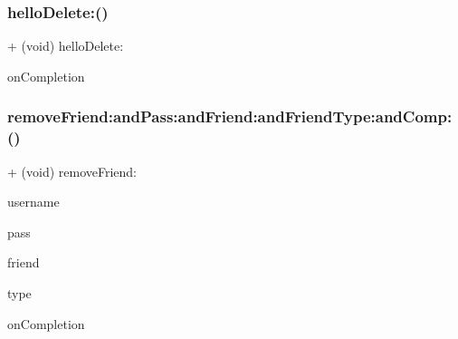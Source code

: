 \hypertarget{interface_delete_a513d95dc95c10c5db1b86e5742515153}{}\label{interface_delete_a513d95dc95c10c5db1b86e5742515153} 
\subsubsection{\texorpdfstring{hello\+Delete\+:()}{helloDelete:()}}
{\footnotesize\ttfamily + (void) hello\+Delete\+: \begin{DoxyParamCaption}\item[{(void($^\wedge$)(B\+O\+OL, id))}]{on\+Completion }\end{DoxyParamCaption}}

\hypertarget{interface_delete_a7dc2f74f32c11ac26dcbed053b7775b9}{}\label{interface_delete_a7dc2f74f32c11ac26dcbed053b7775b9} 
\subsubsection{\texorpdfstring{remove\+Friend\+:and\+Pass\+:and\+Friend\+:and\+Friend\+Type\+:and\+Comp\+:()}{removeFriend:andPass:andFriend:andFriendType:andComp:()}}
{\footnotesize\ttfamily + (void) remove\+Friend\+: \begin{DoxyParamCaption}\item[{(N\+S\+String $\ast$)}]{username }\item[{andPass:(N\+S\+String $\ast$)}]{pass }\item[{andFriend:(N\+S\+String $\ast$)}]{friend }\item[{andFriendType:(int)}]{type }\item[{andComp:(void($^\wedge$)(B\+O\+OL, id))}]{on\+Completion }\end{DoxyParamCaption}}

\hypertarget{interface_delete_ae520ec7dd51ee4fa6fa8eaa7399a8757}{}\label{interface_delete_ae520ec7dd51ee4fa6fa8eaa7399a8757} 
